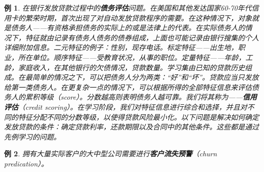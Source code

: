 \documentclass[a4paper,12pt]{ctexart}
\newtheorem{example}{例}[section]
\begin{document}
	\begin{example}
	在银行发放贷款过程中的\textbf{债务评估}问题。在美国和其他发达国家60-70年代信用卡的繁荣时期，首次出现了对自动发放贷款程序的需要。在这种情况下，对象就是债务人——有资格承担债务的实际上的或是法律上的代表。在实际债务人的情况下，特征就由记录有债务人债务的债券组成，上面也可能记录由银行搜集的个人详细附加信息。二元特征的例子：性别，现存电话。标定特征——出生地，职业，所在单位。顺序特征——受教育状况，从事的职位。定量特征——年龄，工龄，家庭收入，在其他银行的欠债情况，贷款数量。学习集由已知的贷款历史组成。在最简单的情况之下，可以把债务人分为两类：“好”和“坏”。贷款应当只发放给第一类债务人。在更复杂一点的情况下，可以根据所得的全部特征信息来评估债务人的累积等级（score）。分数越高则表明债务人越可靠。我们将其称为——\textbf{信用评估}（credit scoring）。在学习阶段，我们对特征信息进行综合和选择，并且对不同的特征分配不同的分数等级，以使得贷款风险最小化。以下问题是解决如何确定发放贷款的条件：确定贷款利率，还款期限以及合同中的其他条件。这些都是通过先例学习的问题。
	\end{example}
	
	\begin{example}
	拥有大量实际客户的大中型公司需要进行\textbf{客户流失预警}（churn predication）。
	\end{example}
\end{document}
